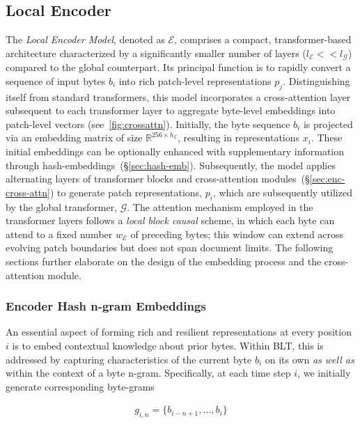 \subsection{Local Encoder}
\label{section:local}

The \textit{Local Encoder Model}, denoted as $\mathcal{E}$, comprises a compact, transformer-based architecture characterized by a significantly smaller number of layers ($l_{\mathcal{E}} << l_{\mathcal{G}}$) compared to the global counterpart. Its principal function is to rapidly convert a sequence of input bytes $b_i$ into rich patch-level representations $p_j$. Distinguishing itself from standard transformers, this model incorporates a cross-attention layer subsequent to each transformer layer to aggregate byte-level embeddings into patch-level vectors (see~\autoref{fig:crossattn}).
Initially, the byte sequence $b_i$ is projected via an embedding matrix of size $\mathbb{R}^{256 \times h_{\mathcal{E}}}$, resulting in representations $x_i$. These initial embeddings can be optionally enhanced with supplementary information through hash-embeddings~(\S\ref{sec:hash-emb}). 
Subsequently, the model applies alternating layers of transformer blocks and cross-attention modules~(\S\ref{sec:enc-cross-attn}) to generate patch representations, $p_i$, which are subsequently utilized by the global transformer, $\mathcal{G}$. The attention mechanism employed in the transformer layers follows a \textit{local block causal} scheme, in which each byte can attend to a fixed number $w_{\mathcal{E}}$ of preceding bytes; this window can extend across evolving patch boundaries but does not span document limits. The following sections further elaborate on the design of the embedding process and the cross-attention module.

\subsubsection{Encoder Hash n-gram Embeddings}
\label{sec:ngram-emb}
\label{sec:hash-emb}
An essential aspect of forming rich and resilient representations at every position $i$ is to embed contextual knowledge about prior bytes. Within {\textsc BLT}, this is addressed by capturing characteristics of the current byte $b_i$ on its own \textit{as well as} within the context of a byte n-gram. Specifically, at each time step $i$, we initially generate corresponding byte-grams

\begin{align}
    g_{i,n}=\{b_{i-n + 1},\ldots, b_i\}
\end{align}

